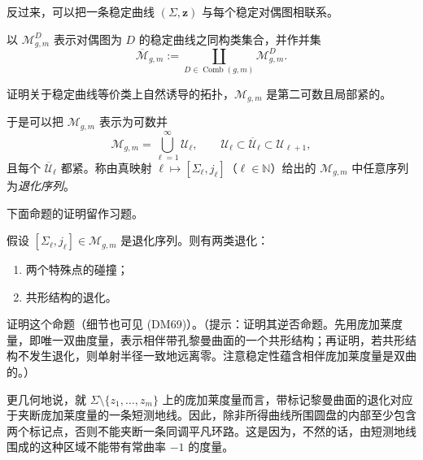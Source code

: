 反过来，可以把一条稳定曲线 $(\Sigma,\mathbf z)$ 与每个稳定对偶图相联系。

\begin{definition}\label{def:stable-curve-strata-dual-graph}
以 $\mathcal M_{g,m}^D$ 表示对偶图为 $D$ 的稳定曲线之同构类集合，并作并集
\[
 \overline{\mathcal M}_{g,m}
 :=\coprod_{D\in\operatorname{Comb}(g,m)}\mathcal M_{g,m}^D.
\]
\end{definition}

\begin{exercise}\label{ex:stable-curves-second-countable-locally-compact}
证明关于稳定曲线等价类上自然诱导的拓扑，$\mathcal M_{g,m}$ 是第二可数且局部紧的。
\end{exercise}

于是可以把 $\mathcal M_{g,m}$ 表示为可数并
\[
 \mathcal M_{g,m}=\bigcup_{\ell=1}^\infty\mathcal U_\ell,
 \qquad \mathcal U_\ell\subset\overline{\mathcal U}_\ell
 \subset\mathcal U_{\ell+1},
\]
且每个 $\overline{\mathcal U}_\ell$ 都紧。称由真映射
$\ell\longmapsto[\Sigma_\ell,j_\ell]$（$\ell\in\mathbb N$）给出的
$\mathcal M_{g,m}$ 中任意序列为\emph{退化序列}。

下面命题的证明留作习题。

\begin{proposition}\label{prop:two-kinds-stable-curve-degeneration}
假设 $[\Sigma_\ell,j_\ell]\in\mathcal M_{g,m}$ 是退化序列。则有两类退化：
\begin{enumerate}[label=(\roman*)]
 \item 两个特殊点的碰撞；
 \item 共形结构的退化。
\end{enumerate}
\end{proposition}

\begin{exercise}\label{ex:two-kinds-degeneration-proof}
证明这个命题（细节也可见 (DM69)）。（提示：证明其逆否命题。先用庞加莱度量，即唯一双曲度量，表示相伴带孔黎曼曲面的一个共形结构；再证明，若共形结构不发生退化，则单射半径一致地远离零。注意稳定性蕴含相伴庞加莱度量是双曲的。）
\end{exercise}

更几何地说，就 $\Sigma\setminus\{z_1,\ldots,z_m\}$ 上的庞加莱度量而言，带标记黎曼曲面的退化对应于夹断庞加莱度量的一条短测地线。因此，除非所得曲线所围圆盘的内部至少包含两个标记点，否则不能夹断一条同调平凡环路。这是因为，不然的话，由短测地线围成的这种区域不能带有常曲率 $-1$ 的度量。

